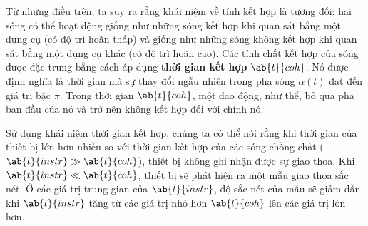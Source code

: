 Từ những điều trên, ta suy ra rằng khái niệm về tính kết hợp là tương đối: hai sóng có thể hoạt động giống như những sóng kết hợp khi quan sát bằng một dụng cụ (có độ trì hoãn thấp) và giống như những sóng không kết hợp khi quan sát bằng một dụng cụ khác (có độ trì hoãn cao).
Các tính chất kết hợp của sóng được đặc trưng bằng cách áp dụng \textbf{thời gian kết hợp} $\ab{t}{coh}$.
Nó được định nghĩa là thời gian mà sự thay đổi ngẫu nhiên trong pha sóng $\alpha(t)$ đạt đến giá trị bậc $\pi$.
Trong thời gian $\ab{t}{coh}$, một dao động, như thể, bỏ qua pha ban đầu của nó và trở nên không kết hợp đối với chính nó.

Sử dụng khái niệm thời gian kết hợp, chúng ta có thể nói rằng khi thời gian của thiết bị lớn hơn nhiều so với thời gian kết hợp của các sóng chồng chất ($\ab{t}{instr}\gg\ab{t}{coh}$), thiết bị không ghi nhận được sự giao thoa.
Khi $\ab{t}{instr}\ll\ab{t}{coh}$, thiết bị sẽ phát hiện ra một mẫu giao thoa sắc nét.
Ở các giá trị trung gian của $\ab{t}{instr}$, độ sắc nét của mẫu sẽ giảm dần khi $\ab{t}{instr}$ tăng từ các giá trị nhỏ hơn
$\ab{t}{coh}$ lên các giá trị lớn hơn.


